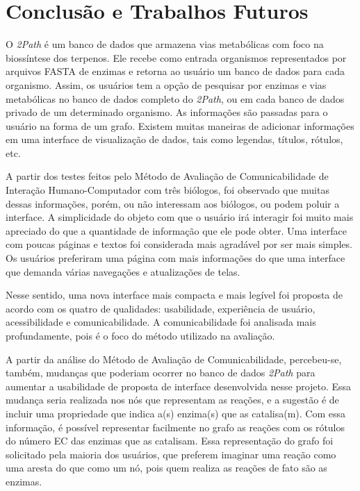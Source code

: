 \chapter{Conclusão e Trabalhos Futuros}

\indent O \textit{2Path} é um banco de dados que armazena vias metabólicas com foco na biossíntese dos terpenos. Ele recebe como entrada organismos representados por arquivos FASTA de enzimas e retorna ao usuário um banco de dados para cada organismo. Assim, os usuários tem a opção de pesquisar por enzimas e vias metabólicas no banco de dados completo do \textit{2Path}, ou em cada banco de dados privado de um determinado organismo. As informações são passadas para o usuário na forma de um grafo. Existem muitas maneiras de adicionar informações em uma interface de visualização de dados, tais como legendas, títulos, rótulos, etc. 

\indent A partir dos testes feitos pelo Método de Avaliação de Comunicabilidade de Interação Humano-Computador com três biólogos, foi observado que muitas dessas informações, porém, ou não interessam aos biólogos, ou podem poluir a interface. A simplicidade do objeto com que o usuário irá interagir foi muito mais apreciado do que a quantidade de informação que ele pode obter. Uma interface com poucas páginas e textos foi considerada mais agradável por ser mais simples. Os usuários preferiram uma página com mais informações do que uma interface que demanda várias navegações e atualizações de telas. 

\indent Nesse sentido, uma nova interface mais compacta e mais legível foi proposta de acordo com os quatro de  qualidades: usabilidade, experiência de usuário, acessibilidade e comunicabilidade. A comunicabilidade foi analisada mais profundamente, pois é o foco do método utilizado na avaliação.

\indent A partir da análise do Método de Avaliação de Comunicabilidade, percebeu-se, também, mudanças que poderiam ocorrer no banco de dados \textit{2Path} para aumentar a usabilidade de proposta de interface desenvolvida nesse projeto. Essa mudança seria realizada nos nós que representam as reações, e a sugestão é de incluir uma propriedade que indica a(s) enzima(s) que as catalisa(m). Com essa informação, é possível representar facilmente no grafo as reações com os rótulos do número EC das enzimas que as catalisam. Essa representação do grafo foi solicitado pela maioria dos usuários, que preferem imaginar uma reação como uma aresta do que como um nó, pois quem realiza as reações de fato são as enzimas.